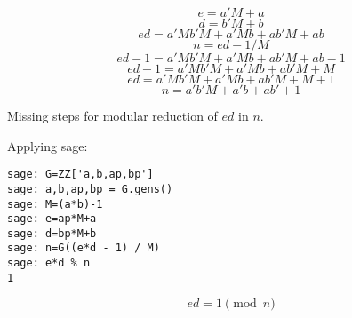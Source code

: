 \documentclass{article}
\begin{document}
\[ e = a'M + a \]
\[ d = b'M + b \]
\[ ed = a'Mb'M + a'Mb + ab'M + ab \]
\[ n = ed-1/M \]
\[ ed-1 = a'Mb'M + a'Mb + ab'M + ab -1 \]
\[ ed-1 = a'Mb'M + a'Mb + ab'M + M \]
\[ ed = a'Mb'M + a'Mb + ab'M + M + 1 \]
\[ n =  a'b'M + a'b + ab' + 1 \]

Missing steps for modular reduction of $ed$ in $n$.

Applying sage:
\begin{verbatim}
sage: G=ZZ['a,b,ap,bp']
sage: a,b,ap,bp = G.gens()
sage: M=(a*b)-1
sage: e=ap*M+a
sage: d=bp*M+b
sage: n=G((e*d - 1) / M)
sage: e*d % n
1
\end{verbatim}

\[ ed = 1 \pmod n \]
\end{document}
